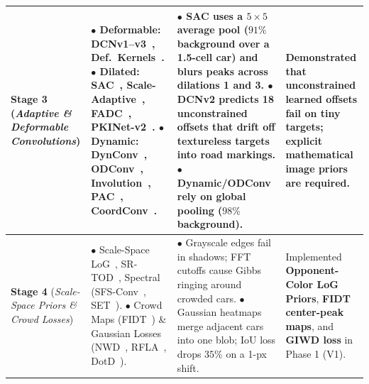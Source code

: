 \documentclass[11pt,a4paper]{article}
\begin{document}
\begin{table}[H]
\begin{tabular}{p{2.2cm} p{3.8cm} p{4.6cm} p{3.8cm}}
\textbf{Stage 3} \newline (\emph{Adaptive \& Deformable Convolutions}) &
$\bullet$ Deformable: DCNv1--v3~\cite{dai2017dcnv1,zhu2019dcnv2,wang2023internimage}, Def.\ Kernels~\cite{gao2020deformablekernels}. \newline
$\bullet$ Dilated: SAC~\cite{qiao2021detectors}, Scale-Adaptive~\cite{zhang2017sac}, FADC~\cite{chen2024fadc}, PKINet-v2~\cite{cai2024pkinet,cai2026pkinetv2}. \newline
$\bullet$ Dynamic: DynConv~\cite{chen2020dynamic}, ODConv~\cite{li2022odconv}, Involution~\cite{li2021involution}, PAC~\cite{su2019pac}, CoordConv~\cite{liu2018coordconv}. &
$\bullet$ \textbf{SAC} uses a $5\times 5$ average pool ($91\%$ background over a 1.5-cell car) and blurs peaks across dilations 1 and 3. \newline
$\bullet$ \textbf{DCNv2} predicts 18 unconstrained offsets that drift off textureless targets into road markings. \newline
$\bullet$ Dynamic/ODConv rely on global pooling ($98\%$ background). &
Demonstrated that unconstrained learned offsets fail on tiny targets; explicit \textbf{mathematical image priors} are required. \\ \midrule

\textbf{Stage 4} \newline (\emph{Scale-Space Priors \& Crowd Losses}) &
$\bullet$ Scale-Space LoG~\cite{lindeberg1994scalespace}, SR-TOD~\cite{cao2024srtod}, Spectral (SFS-Conv~\cite{li2024sfsconv}, SET~\cite{sun2025set}). \newline
$\bullet$ Crowd Maps (FIDT~\cite{liang2022fidt}) \& Gaussian Losses (NWD~\cite{wang2021nwd}, RFLA~\cite{xu2022rfla}, DotD~\cite{xu2021dotd}). &
$\bullet$ Grayscale edges fail in shadows; FFT cutoffs cause Gibbs ringing around crowded cars. \newline
$\bullet$ Gaussian heatmaps merge adjacent cars into one blob; IoU loss drops $35\%$ on a 1-px shift. &
Implemented \textbf{Opponent-Color LoG Priors}, \textbf{FIDT center-peak maps}, and \textbf{GIWD loss} in Phase 1 (V1). \\ \midrule


\end{tabular}
\end{table}
\end{document}
